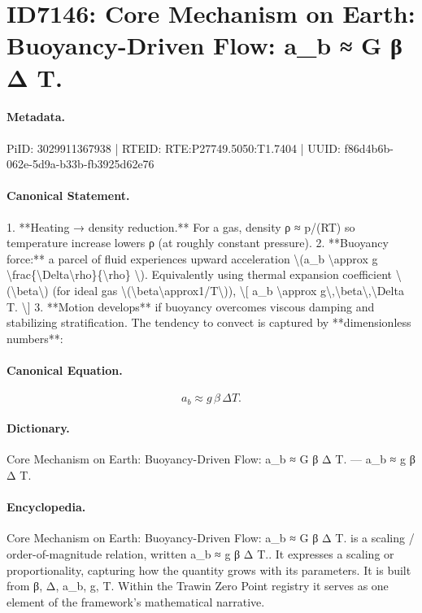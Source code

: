 \section*{ID7146: Core Mechanism on Earth: Buoyancy-Driven Flow: a\_b ≈ G β Δ T.}
\paragraph{Metadata.}
PiID: 3029911367938 | RTEID: RTE:P27749.5050:T1.7404 | UUID: f86d4b6b-062e-5d9a-b33b-fb3925d62e76

\paragraph{Canonical Statement.}
1. **Heating → density reduction.** For a gas, density ρ ≈ p/(RT) so temperature increase lowers ρ (at roughly constant pressure). 2. **Buoyancy force:** a parcel of fluid experiences upward acceleration \textbackslash{}(a\_b \textbackslash{}approx g \textbackslash{}frac\{\textbackslash{}Delta\textbackslash{}rho\}\{\textbackslash{}rho\} \textbackslash{}). Equivalently using thermal expansion coefficient \textbackslash{}(\textbackslash{}beta\textbackslash{}) (for ideal gas \textbackslash{}(\textbackslash{}beta\textbackslash{}approx1/T\textbackslash{})), \textbackslash{}[ a\_b \textbackslash{}approx g\textbackslash{},\textbackslash{}beta\textbackslash{},\textbackslash{}Delta T. \textbackslash{}] 3. **Motion develops** if buoyancy overcomes viscous damping and stabilizing stratification. The tendency to convect is captured by **dimensionless numbers**:

\paragraph{Canonical Equation.}
\[
a_b \approx g\,\beta\,\Delta T.
\]

\paragraph{Dictionary.}
Core Mechanism on Earth: Buoyancy-Driven Flow: a\_b ≈ G β Δ T. — a\_b ≈ g β Δ T.

\paragraph{Encyclopedia.}
Core Mechanism on Earth: Buoyancy-Driven Flow: a\_b ≈ G β Δ T. is a scaling / order-of-magnitude relation, written a\_b ≈ g β Δ T.. It expresses a scaling or proportionality, capturing how the quantity grows with its parameters. It is built from β, Δ, a\_b, g, T. Within the Trawin Zero Point registry it serves as one element of the framework's mathematical narrative.

